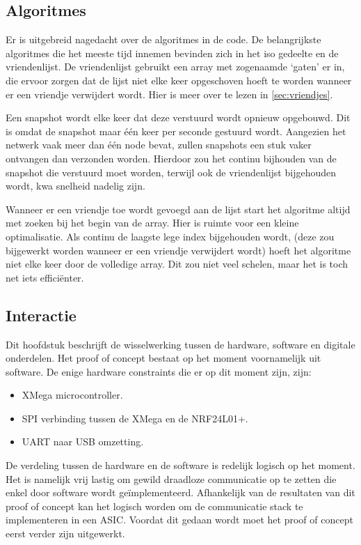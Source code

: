 \subsection{Algoritmes}

Er is uitgebreid nagedacht over de algoritmes in de code. De belangrijkste algoritmes die het meeste tijd innemen bevinden zich in het iso gedeelte en de vriendenlijst. De vriendenlijst gebruikt een array met zogenaamde `gaten' er in, die ervoor zorgen dat de lijst niet elke keer opgeschoven hoeft te worden wanneer er een vriendje verwijdert wordt. Hier is meer over te lezen in \autoref{sec:vriendjes}.

Een snapshot wordt elke keer dat deze verstuurd wordt opnieuw opgebouwd. Dit is omdat de snapshot maar één keer per seconde gestuurd wordt. Aangezien het netwerk vaak meer dan één node bevat, zullen snapshots een stuk vaker ontvangen dan verzonden worden. Hierdoor zou het continu bijhouden van de snapshot die verstuurd moet worden, terwijl ook de vriendenlijst bijgehouden wordt, kwa snelheid nadelig zijn.

Wanneer er een vriendje toe wordt gevoegd aan de lijst start het algoritme altijd met zoeken bij het begin van de array. Hier is ruimte voor een kleine optimalisatie. Als continu de laagste lege index bijgehouden wordt, (deze zou bijgewerkt worden wanneer er een vriendje verwijdert wordt) hoeft het algoritme niet elke keer door de volledige array. Dit zou niet veel schelen, maar het is toch net iets efficiënter.


\subsection{Interactie}

Dit hoofdstuk beschrijft de wisselwerking tussen de hardware, software en digitale onderdelen. Het proof of concept bestaat op het moment voornamelijk uit software. De enige hardware constraints die er op dit moment zijn, zijn:
\begin{itemize}
    \item XMega microcontroller.
    \item SPI verbinding tussen de XMega en de NRF24L01+.
    \item UART naar USB omzetting.
\end{itemize}
De verdeling tussen de hardware en de software is redelijk logisch op het moment. Het is namelijk vrij lastig om gewild draadloze communicatie op te zetten die enkel door software wordt geïmplementeerd. Afhankelijk van de resultaten van dit proof of concept kan het logisch worden om de communicatie stack te implementeren in een ASIC. Voordat dit gedaan wordt moet het proof of concept eerst verder zijn uitgewerkt.

